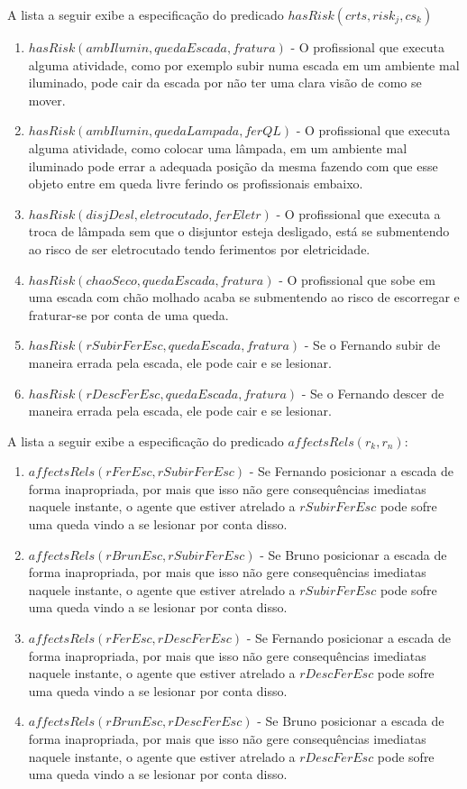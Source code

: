 A lista a seguir exibe a especificação do predicado $hasRisk(crts,risk_j,cs_k)$

\begin{enumerate}
	\item $hasRisk(ambIlumin,quedaEscada,fratura)$ - O profissional que executa alguma atividade, como por exemplo subir numa escada em um ambiente mal iluminado, pode cair da escada por não ter uma clara visão de como se mover. 
	\item $hasRisk(ambIlumin,quedaLampada,ferQL)$ - O profissional que executa alguma atividade, como colocar uma lâmpada, em um ambiente mal iluminado pode errar a adequada posição da mesma fazendo com que esse objeto entre em queda livre ferindo os profissionais embaixo.
	\item $hasRisk(disjDesl, eletrocutado, ferEletr)$ - O profissional que executa a troca de lâmpada sem que o disjuntor esteja desligado, está se submentendo ao risco de ser eletrocutado tendo ferimentos por eletricidade.
	\item $hasRisk(chaoSeco,quedaEscada,fratura)$ - O profissional que sobe em uma escada com chão molhado acaba se submentendo ao risco de escorregar e fraturar-se por conta de uma queda.
	\item $hasRisk(rSubirFerEsc,quedaEscada,fratura)$ - Se o Fernando subir de maneira errada pela escada, ele pode cair e se lesionar. 
	\item $hasRisk(rDescFerEsc,quedaEscada,fratura)$ - Se o Fernando descer de maneira errada pela escada, ele pode cair e se lesionar. 		
\end{enumerate}

A lista a seguir exibe a especificação do predicado $affectsRels(r_k,r_n)$:

\begin{enumerate}
	\item $affectsRels(rFerEsc,rSubirFerEsc)$ - Se Fernando posicionar a escada de forma inapropriada, por mais que isso não gere consequências imediatas naquele instante, o agente que estiver atrelado a $rSubirFerEsc$ pode sofre uma queda vindo a se lesionar por conta disso. 
	\item $affectsRels(rBrunEsc,rSubirFerEsc)$ - Se Bruno posicionar a escada de forma inapropriada, por mais que isso não gere consequências imediatas naquele instante, o agente que estiver atrelado a $rSubirFerEsc$ pode sofre uma queda vindo a se lesionar por conta disso. 
	\item $affectsRels(rFerEsc,rDescFerEsc)$ - Se Fernando posicionar a escada de forma inapropriada, por mais que isso não gere consequências imediatas naquele instante, o agente que estiver atrelado a $rDescFerEsc$ pode sofre uma queda vindo a se lesionar por conta disso. 
	\item $affectsRels(rBrunEsc,rDescFerEsc)$ - Se Bruno posicionar a escada de forma inapropriada, por mais que isso não gere consequências imediatas naquele instante, o agente que estiver atrelado a $rDescFerEsc$ pode sofre uma queda vindo a se lesionar por conta disso. 
\end{enumerate}

